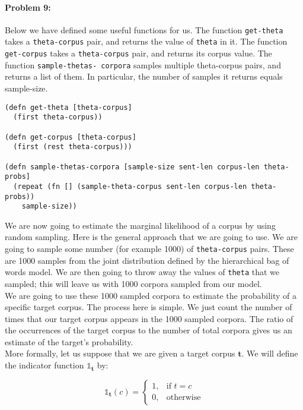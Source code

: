 \documentclass[12pt, letterpaper]{article}
\begin{document}
\hrulefill
\paragraph{Problem 9:}

Below we have defined some useful functions for us. The function
\texttt{get-theta} takes a \texttt{theta-corpus} pair, and returns the
value of \texttt{theta} in it. The function \texttt{get-corpus} takes
a \texttt{theta-corpus} pair, and returns its corpus value. The
function \texttt{sample-thetas- corpora} samples multiple theta-corpus
pairs, and returns a list of them. In particular, the number of
samples it returns equals sample-size.

\begin{lstlisting}
(defn get-theta [theta-corpus]
  (first theta-corpus))

(defn get-corpus [theta-corpus]
  (first (rest theta-corpus)))
  
(defn sample-thetas-corpora [sample-size sent-len corpus-len theta-probs]
  (repeat (fn [] (sample-theta-corpus sent-len corpus-len theta-probs))
    sample-size))
\end{lstlisting}

\noindent We are now going to estimate the marginal likelihood of a corpus by
using random sampling. Here is the general approach that we are going
to use. We are going to sample some number (for example 1000) of
\texttt{theta-corpus} pairs. These are 1000 samples from the joint
distribution defined by the hierarchical bag of words model. We are
then going to throw away the values of \texttt{theta} that we sampled;
this will leave us with 1000 corpora sampled from our model.
\\

\noindent We are going to use these 1000 sampled corpora to estimate
the probability of a specific target corpus. The process here is
simple. We just count the number of times that our target corpus
appears in the 1000 sampled corpora. The ratio of the occurrences of
the target corpus to the number of total corpora gives us an estimate
of the target's probability.
\\

\noindent More formally, let us suppose that we are given a target corpus
$\mathbf{t}$. We will define the indicator function
$\mathds{1}_{\mathbf{t}}$ by:

\begin{equation}
\mathds{1}_{\mathbf{t}}(c) = 
\begin{cases}
    1,& \text{if } t = c\\
    0,              & \text{otherwise}
\end{cases}
\end{equation}
\end{document}
